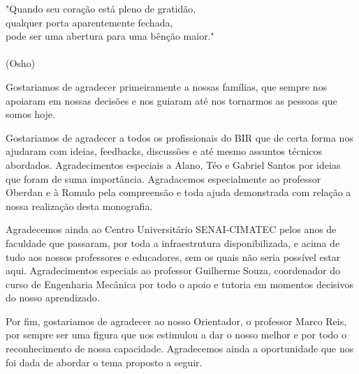 \begin{agradecimentos}
\begin{flushright}
	"Quando seu coração está pleno de gratidão,\\ qualquer porta aparentemente fechada,\\ 
	pode ser uma abertura para uma bênção maior." \\
	\ \\
	(Osho)
\end{flushright}
Gostariamos de agradecer primeiramente a nossas famílias, que sempre nos apoiaram em nossas decisões e nos guiaram até nos tornarmos as pessoas que somos hoje.

Gostariamos de agradecer a todos os profissionais do BIR que de certa forma nos ajudaram com ideias, feedbacks, discussões e até mesmo assuntos técnicos abordados. Agradecimentos especiais a Alano, Téo e Gabriel Santos por ideias que foram de suma importância. Agradacemos especialmente ao professor Oberdan e à Romulo pela compreensão e toda ajuda demonstrada com relação a nossa realização desta monografia. 

Agradecemos ainda ao Centro Universitário SENAI-CIMATEC pelos anos de faculdade que passaram, por toda a infraestrutura disponibilizada, e acima de tudo aos nossos professores e educadores, sem os quais não seria possível estar aqui. Agradecimentos especiais ao professor Guilherme Souza, coordenador do curso de Engenharia Mecânica por todo o apoio e tutoria em momentos decisivos do nosso aprendizado.

Por fim, gostariamos de agradecer ao nosso Orientador, o professor Marco Reis, por sempre ser uma figura que nos estimulou a dar o nosso melhor e por todo o reconhecimento de nossa capacidade. Agradecemos ainda a oportunidade que nos foi dada de abordar o tema proposto a seguir.
\end{agradecimentos}